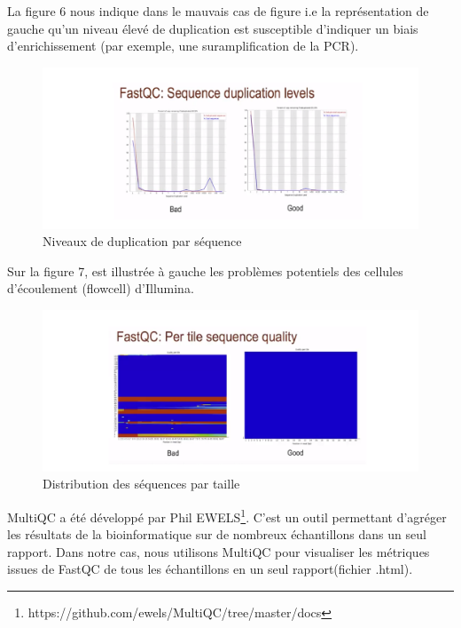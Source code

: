 \documentclass[a4paper,11pt]{article}
\begin{document}
La figure 6 nous indique dans le mauvais cas de figure i.e la
représentation de gauche qu'un niveau élevé de duplication est
susceptible d'indiquer un biais d'enrichissement (par exemple, une
suramplification de la PCR).

\begin{figure}
  \begin{center}
    \includegraphics[width=16cm]{Images/Fastqc_Plots6}
  \end{center}
  \caption{Niveaux de duplication par séquence}
  \label{fig-Fastqc_Plots6}
\end{figure}

Sur la figure 7, est illustrée à gauche les problèmes potentiels des cellules d'écoulement (flowcell) d'Illumina.

\begin{figure}
  \begin{center}
    \includegraphics[width=16cm]{Images/Fastqc_Plots7}
  \end{center}
  \caption{Distribution des séquences par taille}
  \label{fig-Fastqc_Plots7}
\end{figure}


\newpage

MultiQC a été développé par Phil
EWELS\footnote{{https://github.com/ewels/MultiQC/tree/master/docs}}. C'est
un outil permettant d’agréger les résultats de la bioinformatique sur
de nombreux échantillons dans un seul rapport. Dans notre cas, nous
utilisons MultiQC pour visualiser les métriques issues de FastQC de tous les
échantillons en un seul rapport(fichier .html).
\end{document}
